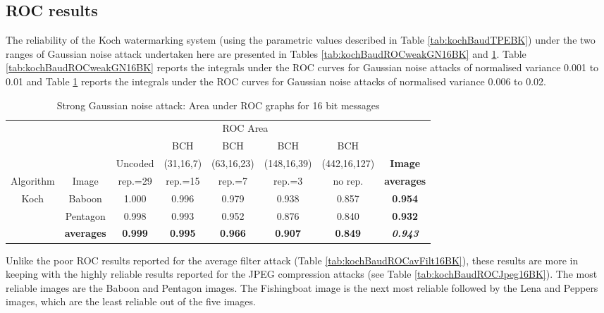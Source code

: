 \documentclass[12pt]{report}
\begin{document}
\subsection{ROC results}
The reliability of the Koch watermarking system (using the parametric values described in Table \ref{tab:kochBaudTPEBK})
under the two ranges of Gaussian noise attack undertaken here are presented in Tables \ref{tab:kochBaudROCweakGN16BK} and 
\ref{tab:kochBaudROCstrongGN16BK}. Table \ref{tab:kochBaudROCweakGN16BK} reports the integrals under the ROC curves for 
Gaussian noise attacks of normalised variance 0.001 to 0.01 and Table \ref{tab:kochBaudROCstrongGN16BK} reports the integrals
under the ROC curves for Gaussian noise attacks of normalised variance 0.006 to 0.02. 
\begin{table}[htb]
\tiny
        \begin{center}
                \begin{tabular}{|c|c||c|c|c|c|c|c|} \hline
		& 		& \multicolumn{5}{c|}{ROC Area} & \\\cline{3-7}
		&		 &		& BCH		      &BCH		   &BCH		& BCH		&\\
                &                & Uncoded       & (31,16,7)          & (63,16,23)         &(148,16,39) & (442,16,127) & {\bf Image}\\
          Algorithm & Image     & rep.=29       &rep.=15                & rep.=7                &rep.=3         & no rep. 	   &{\bf averages}\\ \hline
                Koch		&Baboon          & 1.000         &0.996                  & 0.979                 &0.938      & 0.857 &{\bf 0.954}\\ \cline{2-8}
                		&Pentagon       & 0.998         &0.993                  & 0.952                 &0.876       & 0.840 &{\bf 0.932}\\ \cline{2-8}
				&{\bf averages} &{\bf 0.999} &{\bf 0.995}  &{\bf 0.966}  &{\bf 0.907}  &{\bf 0.849} &{\bf\emph{0.943}}\\\hline
                \end{tabular}
                \caption{Strong Gaussian noise attack: Area under ROC graphs for 16 bit messages}
                \label{tab:kochBaudROCstrongGN16BK}
        \end{center}
\normalsize
\end{table}
Unlike the poor ROC results reported for the
average filter attack (Table \ref{tab:kochBaudROCavFilt16BK}), these results are more in keeping with the 
highly reliable results reported for the JPEG compression attacks (see Table \ref{tab:kochBaudROCJpeg16BK}).
The most reliable images are the Baboon and Pentagon images. The Fishingboat image
is the next most reliable followed by the Lena and Peppers images, which are the least reliable out of the five images.
\end{document}
